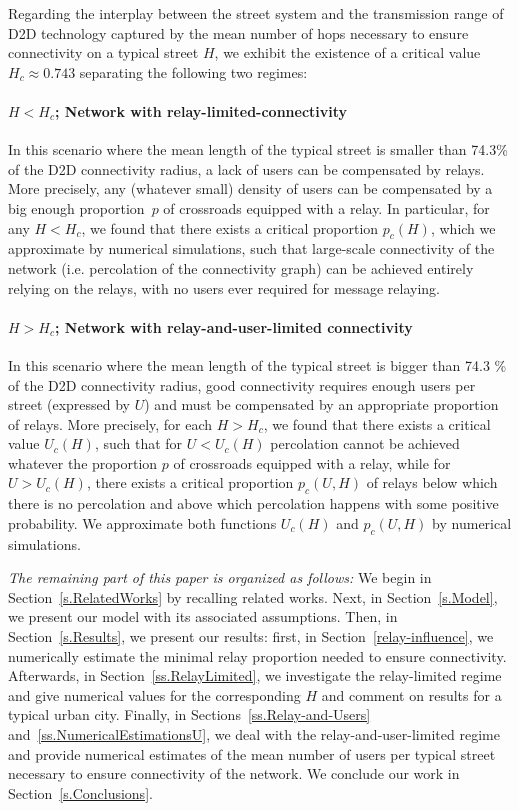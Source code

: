 \documentclass[conference]{IEEEtran}
\begin{document}
Regarding the interplay between the street system and the transmission range of D2D technology
captured by the mean number of hops necessary to
ensure connectivity on a typical street $H$, we exhibit the existence of a critical value \hbox{$H_c\approx 0.743$} separating the following two regimes:
\paragraph{$H<H_c$; Network with relay-limited-connectivity} In this scenario where the mean length of the typical  street
  is smaller  than 74.3\% of the D2D connectivity radius,
  a lack of users can be compensated by
  relays. More precisely, 
  any (whatever small) density of users can be compensated  by a big
  enough proportion~$p$ of crossroads equipped with a relay. In
  particular, for any $H<H_c$, we found that there exists a critical proportion $p_c(H)$,
  which we approximate by numerical simulations, such that large-scale connectivity of the network (i.e. percolation of the connectivity graph) can be achieved
  entirely relying on the relays, with no users ever required for message relaying.
  \paragraph{$H>H_c$; Network with relay-and-user-limited connectivity}
  In this scenario where the mean length of the typical  street is
  bigger  than 74.3 \% of the D2D connectivity radius,
 good connectivity requires enough users per street (expressed by $U$)  and must be compensated by an appropriate proportion of relays. More precisely, for each $H>H_c$, we found that there exists a critical value $U_c(H)$, such that for $U<U_c(H)$ percolation  cannot be achieved whatever the proportion $p$ of crossroads   equipped with a relay, while for  $U>U_c(H)$, there exists a critical
  proportion $p_c(U,H)$ of relays below which there is no percolation
  and above which percolation happens with some  positive probability. We
  approximate both functions $U_c(H)$ and $p_c(U,H)$ by numerical simulations.
\medskip

{\em The remaining part of this paper is organized as follows:} We begin in Section~\ref{s.RelatedWorks} by recalling related works. Next, in Section~\ref{s.Model}, we present our  model with its  associated assumptions. Then, in Section~\ref{s.Results}, we present our results: first, in Section~\ref{relay-influence}, we numerically estimate the minimal relay proportion needed to ensure connectivity. Afterwards, in Section~\ref{ss.RelayLimited}, we investigate the relay-limited regime and give numerical values for the corresponding $H$ and comment on results for a typical urban city. Finally, in Sections~\ref{ss.Relay-and-Users} and~\ref{ss.NumericalEstimationsU}, we deal with the relay-and-user-limited regime and provide numerical estimates of the mean number of users per typical street necessary to ensure connectivity of the network. We conclude our work in Section~\ref{s.Conclusions}.
\end{document}
